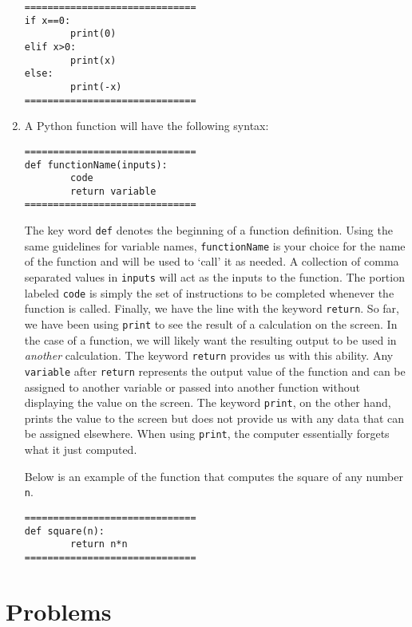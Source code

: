\documentclass{ximera}
\begin{document}
\begin{enumerate}
\begin{verbatim}
==============================
if x==0:
        print(0)
elif x>0:
        print(x)
else:
        print(-x)
==============================
\end{verbatim}

        \item A Python function will have the following syntax:

\begin{verbatim}
==============================
def functionName(inputs):
        code
        return variable
==============================
\end{verbatim}

The key word \verb|def| denotes the beginning of a function definition. Using the same guidelines for variable names, \verb|functionName| is your choice for the name of the function and will be used to `call' it as needed. A collection of comma separated values in \verb|inputs| will act as the inputs to the function.  The portion labeled \verb|code| is simply the set of instructions to be completed whenever the function is called. Finally, we have the line with the keyword \verb|return|. So far, we have been using \verb|print| to see the result of a calculation on the screen. In the case of a function, we will likely want the resulting output to be used in {\em another} calculation. The keyword \verb|return| provides us with this ability. Any \verb|variable| after \verb|return| represents the output value of the function and can be assigned to another variable or passed into another function without displaying the value on the screen. The keyword \verb|print|, on the other hand, prints the value to the screen but does not provide us with any data that can be assigned elsewhere. When using \verb|print|, the computer essentially forgets what it just computed.

Below is an example of the function that computes the square of any number \verb|n|.

\begin{verbatim}
==============================
def square(n):
        return n*n
==============================
\end{verbatim}
\end{enumerate}

\section{Problems}
\end{document}
